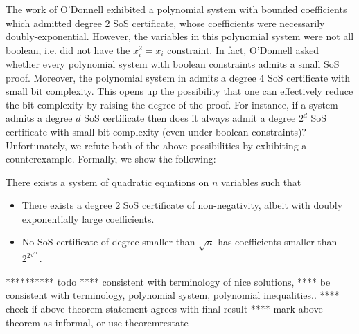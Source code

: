 The work of O'Donnell \cite{odonnell17} exhibited a polynomial system with bounded coefficients which admitted degree $2$ SoS certificate, whose coefficients were necessarily doubly-exponential.
%
However, the variables in this polynomial system were not all boolean, i.e. did not have the $x_i^2 = x_i$ constraint.
%
In fact, O'Donnell asked whether every polynomial system with boolean constraints admits a small SoS proof.
%
Moreover, the polynomial system in \cite{odonnell17} admits a degree $4$ SoS certificate with small bit complexity.  
%
This opens up the possibility that one can effectively reduce the bit-complexity by raising the degree of the proof.
%
For instance, if a system admits a degree $d$ SoS certificate then does it always admit a degree $2^d$ SoS certificate with small bit complexity (even under boolean constraints)?
Unfortunately, we refute both of the above possibilities by exhibiting a counterexample.
%
Formally, we show the following:

\begin{theorem}
	There exists a system of quadratic equations on $n$ variables such that
	\begin{itemize}
	\item There exists a degree $2$ SoS certificate of non-negativity, albeit with doubly exponentially large coefficients.
	\item No SoS certificate of degree smaller than $\sqrt{n}$ has coefficients smaller than $2^{2^{\sqrt{n}}}$.
	\end{itemize}	
\end{theorem}

********** todo
**** consistent with terminology of nice solutions, 
**** be consistent with terminology, polynomial system, polynomial inequalities..
**** check if above theorem statement agrees with final result
**** mark above theorem as informal, or use theoremrestate 



